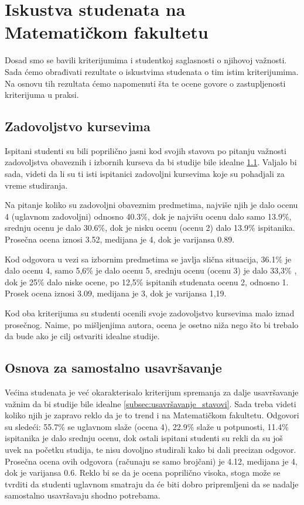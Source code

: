 \documentclass[a4paper]{article}
\begin{document}
{\section{Iskustva studenata na Matematičkom fakultetu}
\label{sec:iskustva}

Dosad smo se bavili kriterijumima i studentkoj saglasnosti o njihovoj važnosti. Sada ćemo obrađivati rezultate o iskustvima studenata o tim istim kriterijumima. Na osnovu tih rezultata ćemo napomenuti šta te ocene govore o zastupljenosti kriterijuma u praksi.  

\subsection{Zadovoljstvo kursevima}
\label{subsec:zadovoljstvo_iskustva}
Ispitani studenti su bili poprilično jasni kod svojih stavova po pitanju važnosti zadovoljstva obaveznih i izbornih kurseva da bi studije bile idealne \ref{subsec:zadovoljstvo_iskustva}. Valjalo bi sada, videti da li su ti isti ispitanici zadovoljni kursevima koje su pohadjali za vreme studiranja.

Na pitanje koliko su zadovoljni obaveznim predmetima, najviše njih je dalo ocenu 4 (uglavnom zadovoljni) odnosno 40.3\%, dok je najvišu ocenu dalo samo 13.9\%, srednju ocenu je dalo 30.6\%, dok je nisku ocenu (ocenu 2) dalo 13.9\% ispitanika. Prosečna ocena iznosi 3.52, medijana je 4, dok je varijansa 0.89.

Kod odgovora u vezi sa izbornim predmetima se javlja slična situacija, 36.1\% je dalo ocenu 4, samo 5,6\% je dalo ocenu 5, srednju ocenu (ocenu 3) je dalo 33,3\% , dok je 25\% dalo niske ocene, po 12,5\% ispitanih studenata ocenu 2, odnosno 1. Prosek ocena iznosi 3.09, medijana je 3, dok je varijansa 1,19. 

Kod oba kriterijuma su studenti ocenili svoje zadovoljstvo kursevima malo iznad prosečnog. Naime, po mišljenjima autora, ocena je osetno niža nego što bi trebalo da bude ako je cilj ostvariti idealne studije.

\subsection{Osnova za samostalno usavršavanje}
\label{subsec:usavršavanje_iskustva}
Većina studenata je već okarakterisalo kriterijum spremanja za dalje usavršavanje važnim da bi studije bile idealne \ref{subsec:usavršavanje_stavovi}. Sada treba videti koliko njih je zapravo reklo da je to trend i na Matematičkom fakultetu.
Odgovori su sledeći: 55.7\%  se uglavnom slaže (ocena 4), 22.9\% slaže u potpunosti,  11.4\%  ispitanika je dalo srednju ocenu, dok ostali ispitani studenti su rekli da su još uvek na početku studija, te nisu dovoljno studirali kako bi dali precizan odgovor. Prosečna ocena ovih odgovora (računaju se samo brojčani) je  4.12, medijana je 4, dok je varijansa 0.6. Reklo bi se da je ocena poprilično visoka, stoga može se tvrditi da studenti uglavnom smatraju da će biti dobro pripremljeni da se nadalje samostalno usavršavaju shodno potrebama.


}
\end{document}
